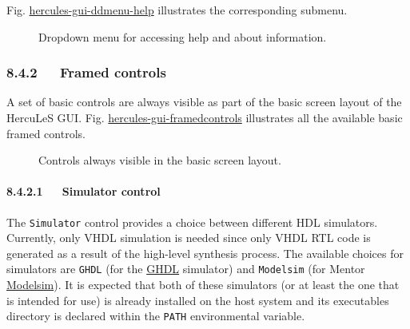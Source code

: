 \documentclass[a4paper]{article}
\begin{document}
Fig. \hyperref[hercules-gui-ddmenu-help]{hercules-gui-ddmenu-help} illustrates the corresponding submenu.
\begin{figure}
\label{hercules-gui-ddmenu-help}
\noindent{}
\caption{Dropdown menu for accessing help and about information.}
\end{figure}


\subsubsection{8.4.2~~~Framed controls%
  \label{framed-controls}%
}

A set of basic controls are always visible as part of the basic screen layout of the HercuLeS GUI. Fig. \hyperref[hercules-gui-framedcontrols]{hercules-gui-framedcontrols} illustrates all the available basic framed controls.
\begin{figure}
\label{hercules-gui-framedcontrols}
\noindent{}
\caption{Controls always visible in the basic screen layout.}
\end{figure}


\paragraph{8.4.2.1~~~Simulator control%
  \label{simulator-control}%
}

The \texttt{Simulator} control provides a choice between different HDL simulators. Currently, only VHDL simulation is needed since only VHDL RTL code is generated as a result of the high-level synthesis process. The available choices for simulators are \texttt{GHDL} (for the \href{http://ghdl.free.fr}{GHDL} simulator) and \texttt{Modelsim} (for Mentor \href{http://www.model.com}{Modelsim}). It is expected that both of these simulators (or at least the one that is intended for use) is already installed on the host system and its executables directory is declared within the \texttt{PATH} environmental variable.
\end{document}
